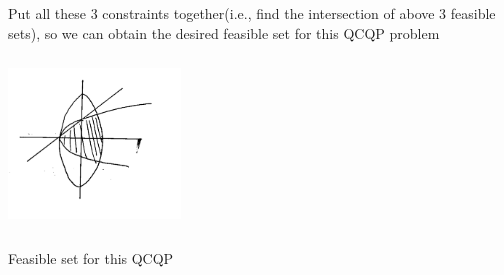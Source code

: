 \begin{example}
Put all these 3 constraints together(i.e., find the intersection of above 3 feasible sets), so we can obtain the desired feasible set for this QCQP problem
\begin{marginfigure}
	\centering
	\includegraphics[width=1.8in,height=1.8in]{figures/ch07/figure1021_5.png}
	\caption{Feasible set for this QCQP} 
\end{marginfigure}
\end{example}

